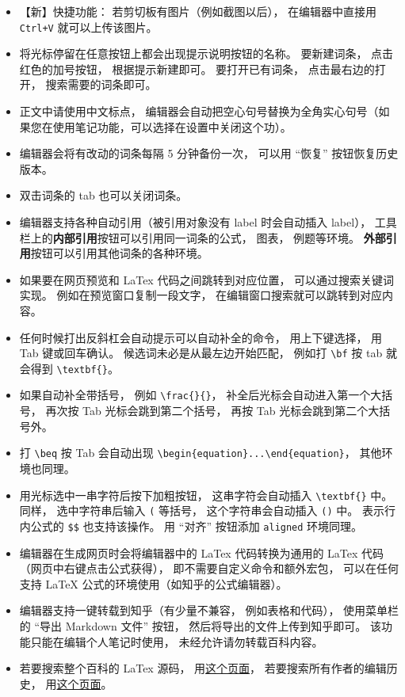 \begin{itemize}
\item 【新】快捷功能： 若剪切板有图片（例如截图以后）， 在编辑器中直接用 \verb|Ctrl+V| 就可以上传该图片。
\item 将光标停留在任意按钮上都会出现提示说明按钮的名称。 要新建词条， 点击红色的加号按钮， 根据提示新建即可。 要打开已有词条， 点击最右边的打开， 搜索需要的词条即可。
\item 正文中请使用中文标点， 编辑器会自动把空心句号替换为全角实心句号（如果您在使用笔记功能，可以选择在设置中关闭这个功）。
\item 编辑器会将有改动的词条每隔 5 分钟备份一次， 可以用 “恢复” 按钮恢复历史版本。
\item 双击词条的 tab 也可以关闭词条。
\item 编辑器支持各种自动引用（被引用对象没有 label 时会自动插入 label）， 工具栏上的\textbf{内部引用}按钮可以引用同一词条的公式， 图表， 例题等环境。 \textbf{外部引用}按钮可以引用其他词条的各种环境。
\item 如果要在网页预览和 LaTex 代码之间跳转到对应位置， 可以通过搜索关键词实现。 例如在预览窗口复制一段文字， 在编辑窗口搜索就可以跳转到对应内容。
\item 任何时候打出反斜杠会自动提示可以自动补全的命令， 用上下键选择， 用 Tab 键或回车确认。 候选词未必是从最左边开始匹配， 例如打 \verb|\bf| 按 tab 就会得到 \verb|\textbf{}|。
\item 如果自动补全带括号， 例如 \verb|\frac{}{}|， 补全后光标会自动进入第一个大括号， 再次按 Tab 光标会跳到第二个括号， 再按 Tab 光标会跳到第二个大括号外。
\item 打 \verb|\beq| 按 Tab 会自动出现 \verb|\begin{equation}...\end{equation}|， 其他环境也同理。
\item 用光标选中一串字符后按下加粗按钮， 这串字符会自动插入 \verb|\textbf{}| 中。 同样， 选中字符串后输入 \verb|(| 等括号， 这个字符串会自动插入 \verb|()| 中。 表示行内公式的 \verb|$$| 也支持该操作。 用 “对齐” 按钮添加 \verb|aligned| 环境同理。
\item 编辑器在生成网页时会将编辑器中的 LaTex 代码转换为通用的 LaTex 代码（网页中右键点击公式获得）， 即不需要自定义命令和额外宏包， 可以在任何支持 LaTeX 公式的环境使用（如知乎的公式编辑器）。
\item 编辑器支持一键转载到知乎（有少量不兼容， 例如表格和代码）， 使用菜单栏的 “导出 Markdown 文件” 按钮， 然后将导出的文件上传到知乎即可。 该功能只能在编辑个人笔记时使用， 未经允许请勿转载百科内容。
\item 若要搜索整个百科的 LaTex 源码， 用\href{https://github.com/MacroUniverse/PhysWiki-log/tree/master/contents}{这个页面}， 若要搜索所有作者的编辑历史， 用\href{https://github.com/MacroUniverse/PhysWiki-backup}{这个页面}。
\end{itemize}

